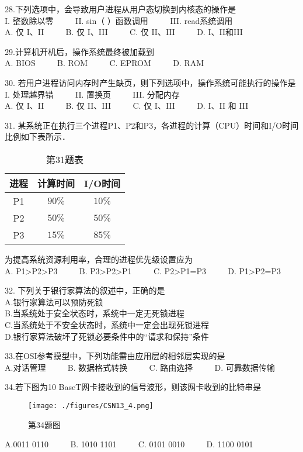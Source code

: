 28.下列选项中，会导致用户进程从用户态切换到内核态的操作是 \\
I. 整数除以零  $\qquad$  II. sin（ ）函数调用  $\qquad$   III. read系统调用 \\
A. 仅 I、II $\qquad$ B. 仅 I、III $\qquad$ C. 仅 II、III $\qquad$ D. I、II和III

29.计算机开机后，操作系统最终被加载到 \\
    A. BIOS $\qquad$ B. ROM $\qquad$ C. EPROM $\qquad$ D. RAM 

30. 若用户进程访问内存时产生缺页，则下列选项中，操作系统可能执行的操作是 \\
    I. 处理越界错 $\qquad$ II. 置换页 $\qquad$ III. 分配内存 \\
    A. 仅 I、II $\qquad$ B. 仅 II、III $\qquad$ C. 仅 I、III $\qquad$ D. I、II 和 III 

31. 某系统正在执行三个进程P1、P2和P3，各进程的计算（CPU）时间和I/O时间比例如下表所示． \\
\begin{table}[ht]
\centering
\caption{第31题表}\label{CSN13_tab3}
\begin{tabular}{|c|c|c|}
\hline
进程 & 计算时间 & I/O时间 \\
\hline
P1 & $90\%$ & $10\%$ \\
\hline
P2 & $50\%$ & $50\%$ \\
\hline
P3 & $15\%$ & $85\%$ \\
\hline
\end{tabular}
\end{table}
为提高系统资源利用率，合理的进程优先级设置应为 \\
A. P1>P2>P3 $\qquad$ B. P3>P2>P1 $\qquad$ C. P2>P1=P3 $\qquad$ D. P1>P2=P3

32. 下列关于银行家算法的叙述中，正确的是 \\
A.银行家算法可以预防死锁 \\
B.当系统处于安全状态时，系统中一定无死锁进程 \\
C.当系统处于不安全状态时，系统中一定会出现死锁进程 \\
D.银行家算法破坏了死锁必要条件中的“请求和保持”条件

33.在OSI参考摸型中，下列功能需由应用层的相邻层实现的是 \\
A.对话管理 $\qquad$ B. 数据格式转换 $\qquad$ C. 路由选择 $\qquad$ D. 可靠数据传输

34.若下图为10 BaseT网卡接收到的信号波形，则该网卡收到的比特串是 \\
\begin{figure}[ht]
\centering
\texttt{[image: ./figures/CSN13\_4.png]}
\caption{第34题图} \label{CSN13_fig4}
\end{figure}
A.0011 0110 $\qquad$ B. 1010 1101 $\qquad$ C. 0101 0010 $\qquad$ D. 1100 0101

